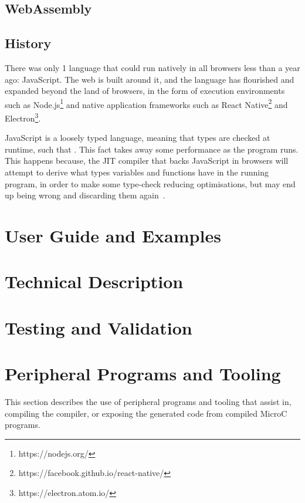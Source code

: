 \documentclass[a4paper]{article}
\begin{document}

\subsection{WebAssembly}

\subsection{History}
There was only 1 language that could run natively in all browsers less than a year ago: JavaScript. The web is built around it, and the language has flourished and expanded beyond the land of browsers, in the form of execution environments such as Node.js\footnote{https://nodejs.org/} and native application frameworks such as React Native\footnote{https://facebook.github.io/react-native/} and Electron\footnote{https://electron.atom.io/}.

JavaScript is a loosely typed language, meaning that types are checked at runtime, such that . This fact takes away some performance as the program runs. This happens because, the JIT compiler that backs JavaScript in browsers will attempt to derive what types variables and functions have in the running program, in order to make some type-check reducing optimisations, but may end up being wrong and discarding them again~\cite{video:thompson-js-perf-v8-and-wasm}.

\section{User Guide and Examples}

\section{Technical Description}

\section{Testing and Validation}

\section{Peripheral Programs and Tooling}
This section describes the use of peripheral programs and tooling that assist in, compiling the compiler, or exposing the generated code from compiled MicroC programs.
\end{document}
